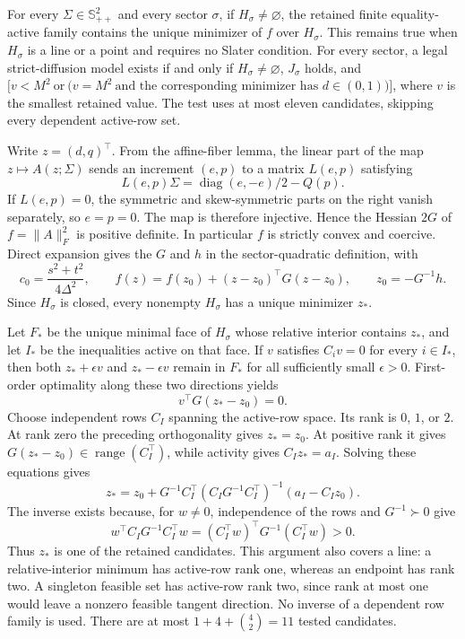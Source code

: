 For every \(\Sigma\in\mathbb S_{++}^2\) and every sector \(\sigma\), if \(H_{\sigma}\ne\varnothing\), the retained finite equality-active family contains the unique minimizer of \(f\) over \(H_{\sigma}\).  This remains true when \(H_{\sigma}\) is a line or a point and requires no Slater condition.  For every sector, a legal strict-diffusion model exists if and only if \(H_{\sigma}\ne\varnothing\), \(J_{\sigma}\) holds, and \(\bigl[v<M^2\ \text{or}\ \bigl(v=M^2\ \text{and the corresponding minimizer has }d\in(0,1)\bigr)\bigr]\), where \(v\) is the smallest retained value.  The test uses at most eleven candidates, skipping every dependent active-row set.

Write \(z=(d,q)^{\top}\).  From the affine-fiber lemma, the linear part of the map \(z\mapsto A(z;\Sigma)\) sends an increment \((e,p)\) to a matrix \(L(e,p)\) satisfying
\[
 L(e,p)\Sigma=\operatorname{diag}(e,-e)/2-Q(p).
\]
If \(L(e,p)=0\), the symmetric and skew-symmetric parts on the right vanish separately, so \(e=p=0\).  The map is therefore injective.  Hence the Hessian \(2G\) of \(f=\lVert A\rVert_F^2\) is positive definite.  In particular \(f\) is strictly convex and coercive.  Direct expansion gives the \(G\) and \(h\) in the sector-quadratic definition, with
\[
 c_0=\frac{s^2+t^2}{4\Delta^2},\qquad
 f(z)=f(z_0)+(z-z_0)^{\top}G(z-z_0),\qquad z_0=-G^{-1}h.
\]
Since \(H_{\sigma}\) is closed, every nonempty \(H_{\sigma}\) has a unique minimizer \(z_*\).

Let \(F_*\) be the unique minimal face of \(H_{\sigma}\) whose relative interior contains \(z_*\), and let \(I_*\) be the inequalities active on that face.  If \(v\) satisfies \(C_i v=0\) for every \(i\in I_*\), then both \(z_*+\epsilon v\) and \(z_*-\epsilon v\) remain in \(F_*\) for all sufficiently small \(\epsilon>0\).  First-order optimality along these two directions yields
\[
 v^{\top}G(z_*-z_0)=0.
\]
Choose independent rows \(C_I\) spanning the active-row space.  Its rank is \(0\), \(1\), or \(2\).  At rank zero the preceding orthogonality gives \(z_*=z_0\).  At positive rank it gives \(G(z_*-z_0)\in\operatorname{range}(C_I^{\top})\), while activity gives \(C_Iz_*=a_I\).  Solving these equations gives
\[
 z_*=z_0+G^{-1}C_I^{\top}
 (C_IG^{-1}C_I^{\top})^{-1}(a_I-C_Iz_0).
\]
The inverse exists because, for \(w\ne0\), independence of the rows and \(G^{-1}\succ0\) give
\[
 w^{\top}C_IG^{-1}C_I^{\top}w
 =(C_I^{\top}w)^{\top}G^{-1}(C_I^{\top}w)>0.
\]
Thus \(z_*\) is one of the retained candidates.  This argument also covers a line: a relative-interior minimum has active-row rank one, whereas an endpoint has rank two.  A singleton feasible set has active-row rank two, since rank at most one would leave a nonzero feasible tangent direction.  No inverse of a dependent row family is used.  There are at most \(1+4+\binom42=11\) tested candidates.

